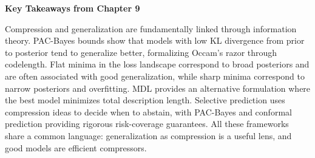 \vspace{1em}

\begin{pausebox}
\textbf{Key Takeaways from Chapter 9}

Compression and generalization are fundamentally linked through information theory. PAC-Bayes bounds show that models with low KL divergence from prior to posterior tend to generalize better, formalizing Occam's razor through codelength. Flat minima in the loss landscape correspond to broad posteriors and are often associated with good generalization, while sharp minima correspond to narrow posteriors and overfitting. MDL provides an alternative formulation where the best model minimizes total description length. Selective prediction uses compression ideas to decide when to abstain, with PAC-Bayes and conformal prediction providing rigorous risk-coverage guarantees. All these frameworks share a common language: generalization as compression is a useful lens, and good models are efficient compressors.
\end{pausebox}
